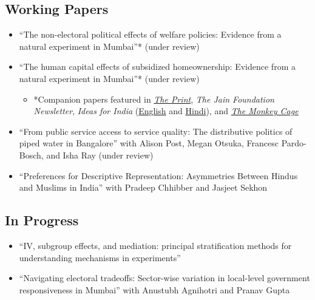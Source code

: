 \documentclass[11pt]{article}
\begin{document}
\subsection*{Working Papers}

\begin{itemize}
	\item[]``The non-electoral political effects of welfare policies: Evidence from a natural experiment in Mumbai''* (under review)
	\item[]``The human capital effects of subsidized homeownership: Evidence from a natural experiment in Mumbai''* (under review)
	\begin{itemize}
	\item[]*Companion papers featured in \href{https://theprint.in/opinion/mumbai-residents-win-govt-housing-lottery-and-spend-more-on-kids-education-jobs-study/290485/}{\textit{The Print}}, \textit{The Jain Foundation Newsletter}, \textit{Ideas for India} (\href{https://www.ideasforindia.in/topics/poverty-inequality/household-level-effects-of-affordable-housing-evidence-from-mumbai.html}{English} and \href{https://www.ideasforindia.in/topics/poverty-inequality/household-level-effects-of-affordable-housing-evidence-from-mumbai-hindi.html}{Hindi}), and \href{https://www.washingtonpost.com/news/monkey-cage/wp/2019/01/31/heres-what-gavin-newsom-elizabeth-warren-and-microsoft-should-know-if-want-to-end-the-affordable-housing-crisis/?tid=sm_tw_cage}{\textit{The Monkey Cage}}
	\end{itemize} 	
	
		\item[]``From public service access to service quality: The distributive politics of piped water in Bangalore'' with Alison Post, Megan Otsuka, Francesc Pardo-Bosch, and Isha Ray (under review)
	
		\item[]``Preferences for Descriptive Representation: Asymmetries Between Hindus and Muslims in India'' with Pradeep Chhibber and Jasjeet Sekhon 
	
		\end{itemize}

\subsection*{In Progress}
\begin{itemize}

	\item[]``IV, subgroup effects, and mediation: principal stratification methods for understanding mechanisms in experiments'' 
		\item[]``Navigating electoral tradeoffs: Sector-wise variation in local-level government responsiveness in Mumbai'' with Anustubh Agnihotri and Pranav Gupta


	\end{itemize}
\vspace{3mm}
\end{document}
